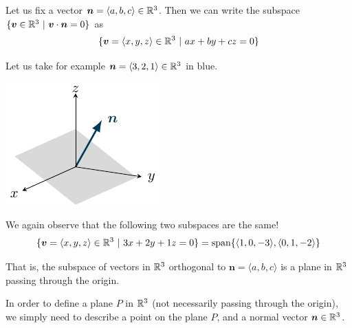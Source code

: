 \begin{example}
    Let us fix a vector $\bm{n} = \langle a, b, c\rangle \in \mathbb{R}^3$.  Then we can write the subspace $\{\bm{v} \in \mathbb{R}^3 \ | \ \bm{v} \cdot \bm{n} = 0\}$ as
    $$\{\bm{v} = \langle x, y, z \rangle \in \mathbb{R}^3 \ | \ ax+by+cz = 0\}$$
    
    Let us take for example $\bm{n} = \langle 3, 2, 1\rangle \in \mathbb{R}^3$ in blue.
    
    
    
 \begin{center}        
        \includegraphics{chapters/1-LinearAlgebra/figures/figures-normalplane.pdf}
    \end{center}

    We again observe that the following two subspaces are the same!
    $$\{\bm{v} = \langle x, y, z\rangle \in \R^3 \ | \ 3x+2y+1z = 0\} = \textnormal{span}\{\langle 1, 0, -3 \rangle, \langle 0, 1, -2 \rangle\}$$
    
    That is, the subspace of vectors in $\mathbb{R}^3$ orthogonal to $\bm{n} = \langle a, b,c \rangle$ is a plane in $\mathbb{R}^3$ passing through the origin.
    
\end{example}
 
In order to define a plane $P$ in $\mathbb{R}^3$ (not necessarily passing through the origin), we simply need to describe a point on the plane $P$, and a normal vector $\bm{n} \in \mathbb{R}^3$.

